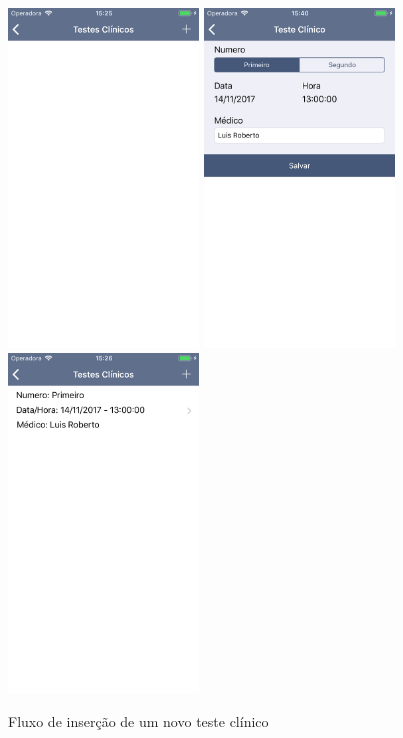 \documentclass[portuguese,oneside]{tcc}
\begin{document}
\begin{figure}[tb]
\begin{center}
\caption{Fluxo de inserção de um novo teste clínico}
	\includegraphics[height=9cm, frame]{testes-clinicos}\quad
	\includegraphics[height=9cm, frame]{teste-clinico-numero}\quad
	\includegraphics[height=9cm, frame]{testes-clinico-filled}
 \label{fig:inserir}
\end{center}
\end{figure}
\end{document}
